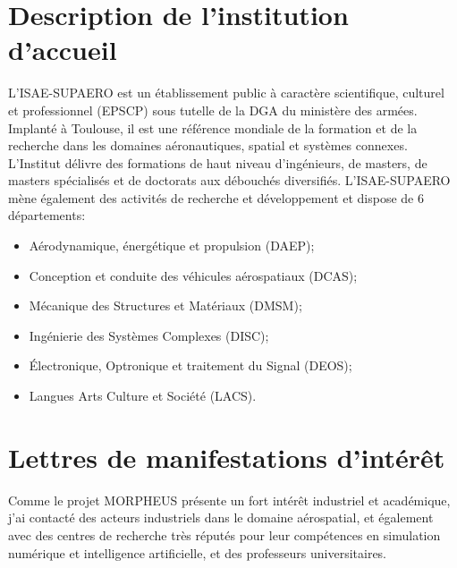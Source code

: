 \documentclass[12pt, french]{article}
\begin{document}
	
	
	
	
	\section{Description de l'institution d'accueil}
	
	L'ISAE-SUPAERO est un établissement public à caractère scientifique, culturel et professionnel (EPSCP) sous tutelle de la DGA du ministère des armées. Implanté à Toulouse, il est une référence mondiale de la formation et de la recherche dans les domaines aéronautiques, spatial et systèmes connexes. L'Institut délivre des
	formations de haut niveau d'ingénieurs, de masters, de masters spécialisés et de doctorats aux débouchés diversifiés. L'ISAE-SUPAERO mène également des activités de recherche et développement et dispose de 6 départements:
	\begin{itemize}
		\item Aérodynamique, énergétique et propulsion (DAEP);
		\item Conception et conduite des véhicules aérospatiaux (DCAS);
		\item Mécanique des Structures et Matériaux (DMSM);
		\item Ingénierie des Systèmes Complexes (DISC); 
		\item Électronique, Optronique et traitement du Signal (DEOS);
		\item Langues Arts Culture et Société (LACS).
	\end{itemize}

	\appendix
	
	\section{Lettres de manifestations d'intérêt}
	
	Comme le projet MORPHEUS présente un fort intérêt industriel et académique, j'ai contacté des acteurs industriels dans le domaine aérospatial, et également avec des centres de recherche très réputés pour leur compétences en simulation numérique et intelligence artificielle, et des professeurs universitaires. 
	
\end{document}
